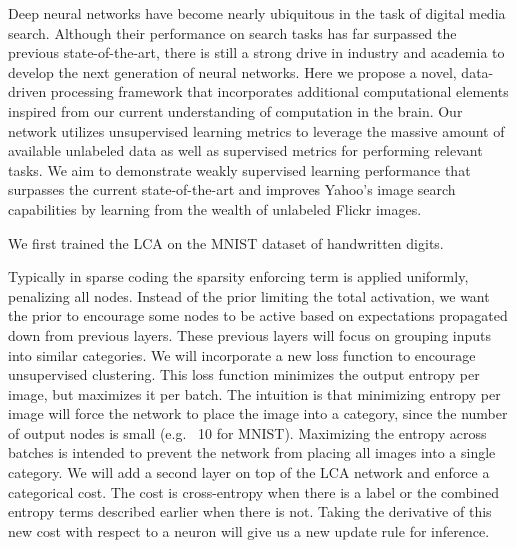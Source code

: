 Deep neural networks have become nearly ubiquitous in the task of digital media search. Although their performance on search tasks has far surpassed the previous state-of-the-art, there is still a strong drive in industry and academia to develop the next generation of neural networks. Here we propose a novel, data-driven processing framework that incorporates additional computational elements inspired from our current understanding of computation in the brain. Our network utilizes unsupervised learning metrics to leverage the massive amount of available unlabeled data as well as supervised metrics for performing relevant tasks. We aim to demonstrate weakly supervised learning performance that surpasses the current state-of-the-art and improves Yahoo’s image search capabilities by learning from the wealth of unlabeled Flickr images.

We first trained the LCA on the MNIST dataset of handwritten digits. 

Typically in sparse coding the sparsity enforcing term is applied uniformly, penalizing all nodes. Instead of the prior limiting the total activation, we want the prior to encourage some nodes to be active based on expectations propagated down from previous layers. These previous layers will focus on grouping inputs into similar categories. We will incorporate a new loss function to encourage unsupervised clustering. This loss function minimizes the output entropy per image, but maximizes it per batch. The intuition is that minimizing entropy per image will force the network to place the image into a category, since the number of output nodes is small (e.g. ~10 for MNIST). Maximizing the entropy across batches is intended to prevent the network from placing all images into a single category. We will add a second layer on top of the LCA network and enforce a categorical cost. The cost is cross-entropy when there is a label or the combined entropy terms described earlier when there is not. Taking the derivative of this new cost with respect to a neuron will give us a new update rule for inference.

